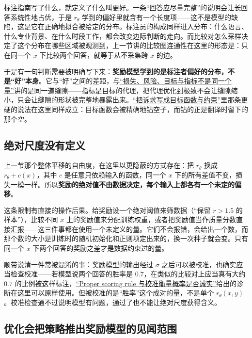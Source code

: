 标注指南写了什么，就定义了什么叫更好。一条``回答应尽量完整''的说明会让长回答系统性地占优，于是 \(r_\theta\) 学到的偏好里就含有一个长度项——这不是模型的缺陷，这是它在正确地拟合被给定的分布。标注员的构成同样进入分布：什么语言、什么专业背景、在什么时段工作，都会改变边际判断的走向。而比较对怎么采样决定了这个分布在哪些区域被观测到，上一节讲的比较图连通性在这里的形态是：只在同一个 \(x\) 下比较两个回答，就等于从不采集跨 \(x\) 的边。

于是有一句判断需要被明确写下来：\textbf{奖励模型学到的是标注者偏好的分布，不是``好''本身}。它与``好''之间的差距，与\hyperref[sec:13-Machine-Learning/01-Learning-Problems-and-Evaluation/02]{``损失、风险、目标与指标不是同一个量''}讲的是同一道缝隙——指标是目标的代理，把代理优化到极致不会让缝隙缩小，只会让缝隙的形状被完整地暴露出来。\hyperref[sec:18-Synthesis/01-System-Lifecycle/01]{``把诉求写成目标函数与约束''}里那条更硬的说法在这里同样成立：目标函数会被精确地钻空子，而钻的正是翻译时留下的那个空。

\subsection{绝对尺度没有定义}

上一节那个整体平移的自由度，在这里以更隐蔽的方式存在：把 \(r_\theta\) 换成 \(r_\theta+c(x)\)，其中 \(c\) 是任意只依赖输入的函数，同一个 \(x\) 下的所有差值不变，损失一模一样。所以\textbf{奖励的绝对值不由数据决定，每个输入上都各有一个未定的偏移}。

这条限制有直接的操作后果。给奖励设一个绝对阈值来筛数据（``保留 \(r>1.5\) 的样本''），比较不同 \(x\) 上的奖励值来分配训练权重，或者把奖励值当作质量分数直接汇报——这三件事都在使用一个未定义的量。它们不会报错，会给出一个数，而那个数的大小是训练时的随机初始化和正则项定出来的，换一次种子就会变。只有同一个 \(x\) 下两个回答的奖励之差才是数据约束过的量。

顺带说清一件常被混淆的事：奖励模型的输出经过 \(\sigma\) 之后可以被校准，也确实应当检查校准——若模型说两个回答的胜率是 \(0.7\)，在类似的比较对上应当真有大约 \(0.7\) 的比例被这样标注，\hyperref[sec:11-Mathematical-Statistics/07-Statistical-Decision-and-Reliable-Prediction/04]{``Proper scoring rule 与校准衡量概率是否诚实''}给出的诊断在这里可以原样使用。但被校准的是``胜率''这个成对的量，不是单个 \(r_\theta(x,y)\)。校准检查通不过说明模型有问题，通过了也不能让绝对尺度获得含义。

\subsection{优化会把策略推出奖励模型的见闻范围}

